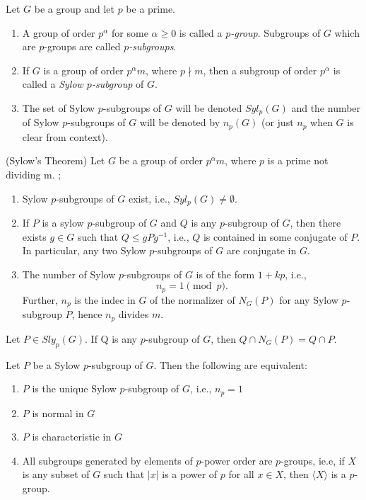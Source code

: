 \documentclass[../main]{subfiles}
\begin{document}
 
 \begin{dfn}
  Let $G$ be a group and let $p$ be a prime.
  \begin{enumerate}
   \item A group of order $p^\alpha$ for some $\alpha \geq 0$ is called a \textit{$p$-group}. Subgroups of $G$ which are $p$-groups are called \textit{$p$-subgroups}. 
   \item If $G$ is a group of order $p^\alpha m$, where $p\nmid m$, then a subgroup of order $p^\alpha$ is called a \textit{Sylow $p$-subgroup} of $G$.
   \item The set of Sylow $p$-subgroups of $G$ will be denoted $Syl_p(G)$ and the number of Sylow $p$-subgroups of $G $ will be denoted by $n_p(G)$ (or just $n_p$ when $G$ is clear from context).
  \end{enumerate}
 \end{dfn}
 
 
 \begin{thm}
  (Sylow's Theorem) Let $G$ be a group of order $p^\alpha m$, where $p$ is a prime not dividing m. ;
  \begin{enumerate}
   \item Sylow $p$-subgroups of $G$ exist, i.e., $Syl_p(G) \neq \emptyset$.
   \item If $P$ is a sylow $p$-subgroup of $G$ and $Q$ is any $p$-subgroup of $G$, then there exists $g \in G$ such that $Q \leq gPg^{-1}$, i.e., $Q$ is contained in some conjugate of $P$. In particular, any two  Sylow $p$-subgroups of $G$ are conjugate in $G$.
   \item The number of Sylow $p$-subgroups of $G$ is of the form $1+kp$, i.e., 
   \[n_p=1 \pmod{p}.\]
   Further, $n_p$ is the indec in $G$ of the normalizer of $N_G(P)$ for any Sylow $p$-subgroup $P$, hence $n_p$ divides $m$.
  \end{enumerate}
 \end{thm}
 
 
 \begin{lem}
  Let $P\in Sly_p(G)$. If Q is any $p$-subgroup of $G$, then $Q\cap N_G(P) = Q\cap P$.
 \end{lem}
 
 
 \begin{cor}
  Let $P$ be a Sylow $p$-subgroup of $G$. Then the following are equivalent:
  \begin{enumerate}
   \item $P$ is the unique Sylow $p$-subgroup of $G$, i.e., $n_p = 1$
   \item $P$ is normal in $G$
   \item $P$ is characteristic in $G$ 
   \item All subgroups generated by elements of $p$-power order are $p$-groups, ie.e, if $X$ is any subset of $G$ such that $|x|$ is a power of $p$ for all $x\in X$, then $\langle X \rangle$ is a $p$-group.
  \end{enumerate}
 \end{cor}
 
\end{document}
